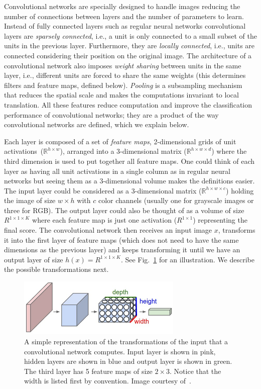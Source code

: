 Convolutional networks are specially designed to handle images reducing the number of connections between layers and the number of parameters to learn. Instead of fully connected layers such as regular neural networks convolutional layers are \emph{sparsely connected}, i.e., a unit is only connected to a small subset of the units in the previous layer. Furthermore, they are \emph{locally connected}, i.e., units are connected considering their position on the original image. The architecture of a convolutional network also imposes \emph{weight sharing} between units in the same layer, i.e., different units are forced to share the same weights (this determines filters and feature maps, defined below). \emph{Pooling} is a subsampling mechanism that reduces the spatial scale and makes the computations invariant to local translation. All these features reduce computation and improve the classification performance of convolutional networks; they are a product of the way convolutional networks are defined, which we explain below.

Each layer is composed of a set of \emph{feature maps}, 2-dimensional grids of unit activations~($\mathbb{R}^{h\times w}$), arranged into a 3-dimensional matrix ($\mathbb{R}^{h\times w \times d}$) where the third dimension is used to put together all feature maps. One could think of each layer as having all unit activations in a single column as in regular neural networks but seeing them as a 3-dimensional volume makes the definitions easier. The input layer could be considered as a 3-dimensional matrix ($\mathbb{R}^{h\times w \times c}$) holding the image of size $w\times h$ with $c$ color channels (usually one for grayscale images or three for RGB). The output layer could also be thought of as a volume of size $R^{1\times 1 \times K}$ where each feature map is just one activation ($R^{1\times 1}$) representing the final score. The convolutional network then receives an input image $x$, transforms it into the first layer of feature maps (which does not need to have the same dimensions as the previous layer) and keeps transforming it until we have an output layer of size $h(x) = R^{1\times 1 \times K}$. See Fig.~\ref{fig:ConvNetVolumes} for an illustration. We describe the possible transformations next.
\begin{figure}[h]
	\centering
	\includegraphics[width = 0.7\textwidth]{plots/convNetVolumes.jpeg}
	\caption[Convolutional network visualization]{A simple representation of the transformations of the input that a convolutional network computes. Input layer is shown in pink, hidden layers are shown in blue and output layer is shown in green. The third layer has 5 feature maps of size $2\times3$. Notice that the width is listed first by convention. Image courtesy of~\cite{Karpathy2015}.}
	\label{fig:ConvNetVolumes}
\end{figure}

